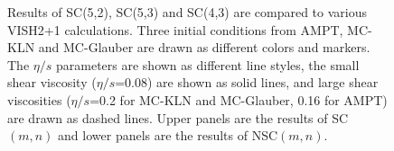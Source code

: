 \documentclass[ALICE,manyauthors]{cernphprep}
\begin{document}
\begin{figure}[p]
\begin{center}
        \caption{Results of  SC(5,2), SC(5,3) and SC(4,3) are compared to various VISH2+1 calculations. Three initial conditions from AMPT, MC-KLN and MC-Glauber are drawn as different colors and markers. The $\eta/s$ parameters are shown as different line styles, the small shear viscosity ($\eta/s$=0.08) are shown as solid lines, and large shear viscosities ($\eta/s$=0.2 for MC-KLN and MC-Glauber, 0.16 for AMPT) are drawn as dashed lines. Upper panels are the results of SC$(m,n)$ and lower panels are the results of NSC$(m,n)$.}
        \label{fig:Figure_6}
        \end{center}   
 \end{figure}
 
\end{document}
